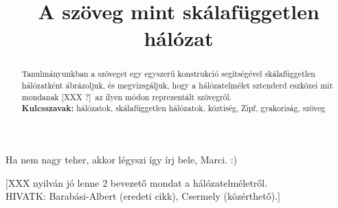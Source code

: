 \documentclass{llncs}
\newcommand{\XXX}[1]{{\small \color{megjcolor} [XXX #1]}}
\newcommand{\XXXk}{\XXX{?}\ }
\newcommand{\marci}[1]{{\color{marcicolor} #1}}
\begin{document}


\title{A szöveg mint skálafüggetlen hálózat}
\author{\institute{}}
\maketitle


\begin{abstract}
Tanulmányunkban a szöveget egy egyszerű konstrukció segítségével
skálafüggetlen hálózatként ábrázoljuk,
és megvizsgáljuk, hogy a hálózatelmélet sztenderd eszközei
mit mondanak \XXXk az ilyen módon reprezentált szövegről.
\\{\bf Kulcsszavak:} hálózatok, skálafüggetlen hálózatok, köztiség, Zipf, gyakoriság, szöveg
\end{abstract}


 
% 
%
%
%
%
%
%

\marci{Ha nem nagy teher, akkor légyszi így írj bele, Marci. :)}


\XXX{nyilván jó lenne 2 bevezető mondat a hálózatelméletről.\\
HIVATK: Barabási-Albert (eredeti cikk), Csermely (közérthető).}
\end{document}
